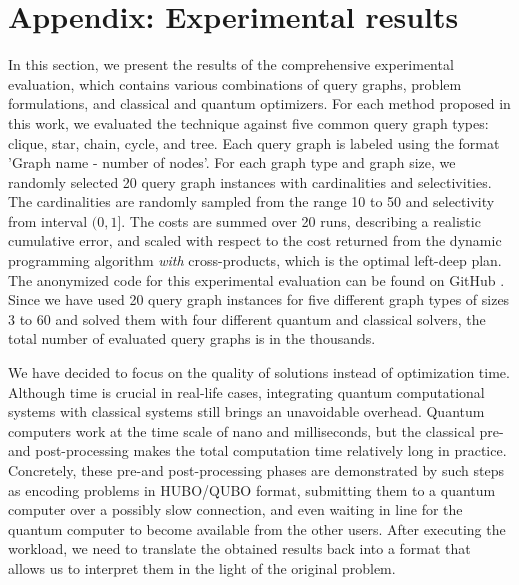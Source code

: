 \section{Appendix: Experimental results}
In this section, we present the results of the comprehensive experimental evaluation, which contains various combinations of query graphs, problem formulations, and classical and quantum optimizers. For each method proposed in this work, we evaluated the technique against five common query graph types: clique, star, chain, cycle, and tree. Each query graph is labeled using the format 'Graph name - number of nodes'. For each graph type and graph size, we randomly selected 20 query graph instances with cardinalities and selectivities. The cardinalities are randomly sampled from the range 10 to 50 and selectivity from interval $(0, 1]$. The costs are summed over 20 runs, describing a realistic cumulative error, and scaled with respect to the cost returned from the dynamic programming algorithm \textit{with} cross-products, which is the optimal left-deep plan. The anonymized code for this experimental evaluation can be found on GitHub \cite{anonymous2024qjoin}. Since we have used 20 query graph instances for five different graph types of sizes 3 to 60 and solved them with four different quantum and classical solvers, the total number of evaluated query graphs is in the thousands.


We have decided to focus on the quality of solutions instead of optimization time. Although time is crucial in real-life cases, integrating quantum computational systems with classical systems still brings an unavoidable overhead. Quantum computers work at the time scale of nano and milliseconds, but the classical pre-and post-processing makes the total computation time relatively long in practice. Concretely, these pre-and post-processing phases are demonstrated by such steps as encoding problems in HUBO/QUBO format, submitting them to a quantum computer over a possibly slow connection, and even waiting in line for the quantum computer to become available from the other users. After executing the workload, we need to translate the obtained results back into a format that allows us to interpret them in the light of the original problem.

